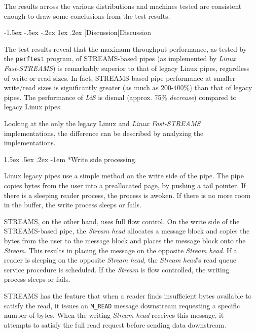 \documentclass[letterpaper,final,notitlepage,twocolumn,10pt,twoside]{article}
\makeatletter
\renewcommand\subsection{\@startsection{subsection}{2}{\z@}%
                                     {-1.5ex \@plus -.5ex \@minus -.2ex}%
                                     {1ex \@plus .2ex}%
                                     {\normalfont\normalsize\bfseries}}
\renewcommand\paragraph{\@startsection{paragraph}{4}{\z@}%
                                    {1.5ex \@plus .5ex \@minus .2ex}%
                                    {-1em}%
                                    {\normalfont\normalsize\bfseries\slshape}}
\makeatother
\begin{document}
The results across the various distributions and machines tested are
consistent enough to draw some conclusions from the test results.

\subsection[Discussion]{Discussion}

The test results reveal that the maximum throughput performance, as tested by
the \texttt{perftest} program, of STREAMS-based pipes (as implemented by
\textsl{Linux Fast-STREAMS}) is remarkably superior to that of legacy Linux
pipes, regardless of write or read sizes.  In fact, STREAMS-based pipe
performance at smaller write/read sizes is significantly greater (as much as
200-400\%) than that of legacy pipes.  The performance of \textsl{LiS} is
dismal (approx. 75\% {\em decrease}) compared to legacy Linux pipes.

Looking at the only the legacy Linux and \textsl{Linux Fast-STREAMS}
implementations, the difference can be described by analyzing the
implementations.

\paragraph*{Write side processing.}

Linux legacy pipes use a simple method on the write side of the pipe.  The
pipe copies bytes from the user into a preallocated page, by pushing a tail
pointer.  If there is a sleeping reader process, the process is awoken.  If
there is no more room in the buffer, the write process sleeps or fails.

STREAMS, on the other hand, uses full flow control.  On the write side of the
STREAMS-based pipe, the \textit{Stream head} allocates a message block and
copies the bytes from the user to the message block and places the message
block onto the \textit{Stream}.  This results in placing the message on the
opposite \textit{Stream head}.  If a reader is sleeping on the opposite
\textit{Stream head}, the \textit{Stream head}'s read queue service procedure
is scheduled.  If the \textit{Stream} is flow controlled, the writing process
sleeps or fails.

STREAMS has the feature that when a reader finds insufficient bytes available
to satisfy the read, it issues an \texttt{M\_READ} message downstream
requesting a specific number of bytes.  When the writing \textit{Stream head}
receives this message, it attempts to satisfy the full read request before
sending data downstream.
\end{document}
